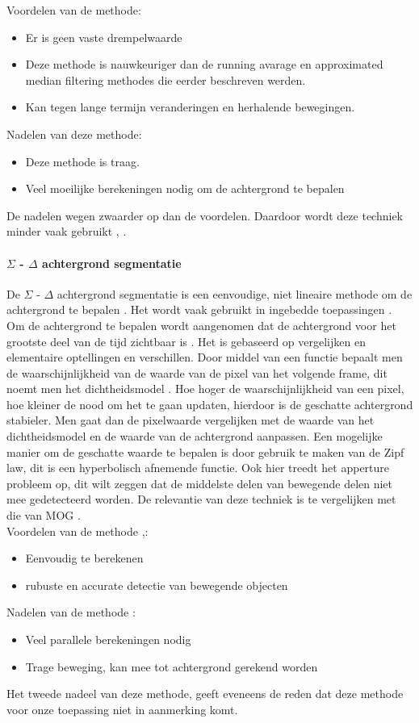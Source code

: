 Voordelen van de methode:
\begin{itemize}
	\item Er is geen vaste drempelwaarde
	\item Deze methode is nauwkeuriger dan de running avarage en approximated median filtering methodes die eerder beschreven werden.
	\item Kan tegen lange termijn veranderingen en herhalende bewegingen.
\end{itemize}
Nadelen van deze methode:
\begin{itemize}
	\item Deze methode is traag.
	\item Veel moeilijke berekeningen nodig om de achtergrond te bepalen
\end{itemize}
De nadelen wegen zwaarder op dan de voordelen. Daardoor wordt deze techniek minder vaak gebruikt \cite{bibSDB}, \cite{bibMOG}.

\paragraph{ $\Sigma$ - $\Delta$ achtergrond segmentatie}
De $\Sigma$ - $\Delta$ achtergrond segmentatie is een eenvoudige, niet lineaire methode om de achtergrond te bepalen \cite{bibSDB}. Het wordt vaak gebruikt in ingebedde toepassingen \cite{bibBET8}. Om de achtergrond te bepalen wordt aangenomen dat de achtergrond voor het grootste deel van de tijd zichtbaar is \cite{bibSDB2}. Het is gebaseerd op vergelijken en elementaire optellingen en verschillen. 
Door middel van een functie bepaalt men de waarschijnlijkheid van de waarde van de pixel van het volgende frame, dit noemt men het dichtheidsmodel .  Hoe hoger de waarschijnlijkheid van een pixel, hoe kleiner de nood om het te gaan updaten, hierdoor is de geschatte achtergrond stabieler. \cite{bibSDB2} Men gaat dan de pixelwaarde vergelijken met de waarde van het dichtheidsmodel en de waarde van de achtergrond aanpassen. Een mogelijke manier om de geschatte waarde te bepalen is door gebruik te maken van de Zipf law, dit is een hyperbolisch afnemende functie. Ook hier treedt het apperture probleem op, dit wilt zeggen dat de middelste delen van bewegende delen niet mee gedetecteerd worden. De relevantie van deze techniek is te vergelijken met die van MOG \cite{bibSDB}.\\
Voordelen van de methode \cite{bibSDB2},\cite{bibSDB3}:
\begin{itemize}
	\item Eenvoudig te berekenen
	\item rubuste en accurate detectie van bewegende objecten
\end{itemize}
Nadelen van de methode \cite{bibSDB3}:
\begin{itemize}
	\item Veel parallele berekeningen nodig
	\item Trage beweging, kan mee tot achtergrond gerekend worden
\end{itemize}
Het tweede nadeel van deze methode, geeft eveneens de reden dat deze methode voor onze toepassing niet in aanmerking komt.


